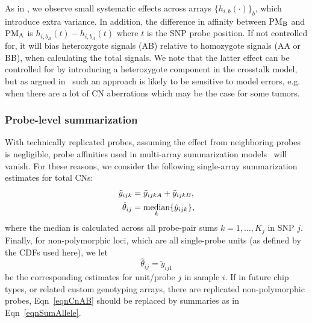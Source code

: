 \documentclass{bioinfo}
\newcommand{\GWS}{GWS\xspace}
\newcommand{\PMA}{\ensuremath{\textnormal{PM}_\textnormal{A}}\xspace}
\newcommand{\PMB}{\ensuremath{\textnormal{PM}_\textnormal{B}}\xspace}
\DeclareMathOperator{\median}{\textnormal{median}}
\begin{document}
As in \citet{CarvalhoB_etal_2007}, we observe small systematic effects across arrays $\{h_{i,b}(\cdot)\}_b$, which introduce extra variance.  In addition, the difference in affinity between \PMB and \PMA is $h_{i,b_B}(t) - h_{i,b_A}(t)$ where $t$ is the SNP probe position.  If not controlled for, it will bias heterozygote signals (AB) relative to homozygote signals (AA or BB), when calculating the total signals.
We note that the latter effect can be controlled for by introducing a heterozygote component in the crosstalk model, but as argued in~\citet{BengtssonH_etal_2008} such an approach is likely to be sensitive to model errors, e.g. when there are a lot of CN aberrations which may be the case for some tumors.


\subsubsection{Probe-level summarization}
\label{secSummarizationModel}
With technically replicated probes, assuming the effect from neighboring probes is negligible, probe affinities used in multi-array summarization models~\citep{BengtssonH_etal_2008} will vanish.
For these reasons, we consider the following single-array summarization estimates for total CNs:
\begin{align}
  \tilde{y}_{ijk} &= \tilde{y}_{ijkA} + \tilde{y}_{ijkB}, \notag \\
  \hat{\theta}_{ij} &= \median_{k} \{\tilde{y}_{ijk}\},
  \label{eqnSumAllele}
\end{align}
where the median is calculated across all probe-pair sums $k=1,\ldots,K_j$ in SNP $j$.
Finally, for non-polymorphic loci, which are all single-probe units (as defined by the CDFs used here), we let
\begin{equation}
  \hat{\theta}_{ij} = \tilde{y}_{ij1}
  \label{eqnCnAB}
\end{equation}
be the corresponding estimates for unit/probe $j$ in sample $i$.  If in future chip types, or related custom genotyping arrays, there are replicated non-polymorphic probes, Eqn~\eqref{eqnCnAB} should be replaced by summaries as in Eqn~\eqref{eqnSumAllele}.  
\end{document}
